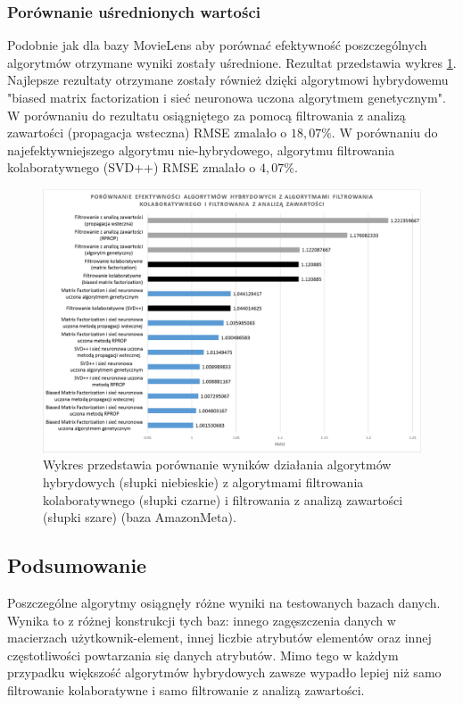 \documentclass[twoside]{iisthesis}
\begin{document}
		\subsubsection{Porównanie uśrednionych wartości}
		
		Podobnie jak dla bazy MovieLens aby porównać efektywność poszczególnych algorytmów otrzymane wyniki zostały uśrednione. Rezultat przedstawia wykres \ref{fig:am_exphybrid}. Najlepsze rezultaty otrzymane zostały również dzięki algorytmowi hybrydowemu "biased matrix factorization i sieć neuronowa uczona algorytmem genetycznym". W porównaniu do rezultatu osiągniętego za pomocą filtrowania z analizą zawartości (propagacja wsteczna) RMSE zmalało o  $18,07\%$. W porównaniu do najefektywniejszego algorytmu nie-hybrydowego, algorytmu filtrowania kolaboratywnego (SVD++) RMSE zmalało o $4,07\%$.
		
		\begin{figure}
			\centering
			\includegraphics[width=1\textwidth]{am_exphybrid}	
			\caption{Wykres przedstawia porównanie wyników działania algorytmów hybrydowych (słupki niebieskie) z algorytmami filtrowania kolaboratywnego (słupki czarne) i filtrowania z analizą zawartości (słupki szare) (baza AmazonMeta).}
			\label{fig:am_exphybrid}
		\end{figure}
		
		\subsection{Podsumowanie}
		
		Poszczególne algorytmy osiągnęły różne wyniki na testowanych bazach danych. Wynika to z różnej konstrukcji tych baz: innego zagęszczenia danych w macierzach użytkownik-element, innej liczbie atrybutów elementów oraz innej częstotliwości powtarzania się danych atrybutów. Mimo tego w każdym przypadku większość algorytmów hybrydowych zawsze wypadło lepiej niż samo filtrowanie kolaboratywne i samo filtrowanie z analizą zawartości. 
	
\end{document}
